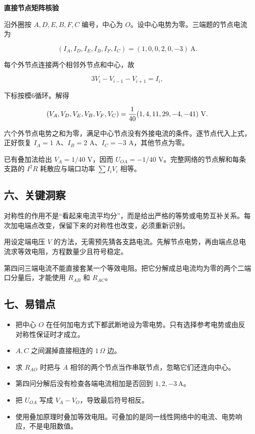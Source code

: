 \documentclass[12pt,a4paper,UTF8]{ctexart}
\newcommand{\tightlist}{\setlength{\itemsep}{0pt}\setlength{\parskip}{0pt}}
\begin{document}
\textbf{直接节点矩阵核验}

沿外圈按 \(A,D,E,B,F,C\) 编号，中心为
\(O\)。设中心电势为零。三端题的节点电流为

\[(I_A,I_D,I_E,I_B,I_F,I_C)=(1,0,0,2,0,-3)\ \mathrm A.\]

每个外节点连接两个相邻外节点和中心，故

\[3V_i-V_{i-1}-V_{i+1}=I_i,\]

下标按模6循环。解得

\[\left(V_A,V_D,V_E,V_B,V_F,V_C\right)
=\frac1{40}(1,4,11,29,-4,-41)\ {\rm V}.\]

六个外节点电势之和为零，满足中心节点没有外接电流的条件。逐节点代入上式，正好恢复
\(I_A=1\) A、\(I_B=2\) A、\(I_C=-3\) A，其他节点为零。

已有叠加法给出 \(V_A=1/40\) V，因而 \(U_{OA}=-1/40\)
V。完整网络的节点解和每条支路的 \(I^2R\) 耗散应与端口功率
\(\sum I_iV_i\) 相等。

\subsection{六、关键洞察}\label{ux516dux5173ux952eux6d1eux5bdf-5}

对称性的作用不是``看起来电流平均分''，而是给出严格的等势或电势互补关系。每次加电端点改变，保留下来的对称性也改变，必须重新识别。

用设定端电压 \(V\)
的方法，无需预先猜各支路电流。先解节点电势，再由端点总电流求等效电阻，方程数量少且符号稳定。

第四问三端电流不能直接套某一个等效电阻。把它分解成总电流均为零的两个二端口分量后，才能使用
\(R_{AB}\) 和 \(R_{AC}\)。

\subsection{七、易错点}\label{ux4e03ux6613ux9519ux70b9-5}

\begin{itemize}
\tightlist
\item
  把中心 \(O\)
  在任何加电方式下都武断地设为零电势。只有选择参考电势或由反对称性保证时才成立。
\item
  \(A,C\) 之间漏掉直接相连的 \(1\,\Omega\) 边。
\item
  求 \(R_{AO}\) 时把与 \(A\)
  相邻的两个节点当作串联节点，忽略它们还连向中心。
\item
  第四问分解后没有检查各端电流相加是否回到 \(1,2,-3\,\mathrm A\)。
\item
  把 \(U_{OA}\) 写成 \(V_A-V_O\)，导致最后符号相反。
\item
  使用叠加原理时叠加等效电阻。可叠加的是同一线性网络中的电流、电势响应，不是电阻数值。
\end{itemize}
\end{document}
